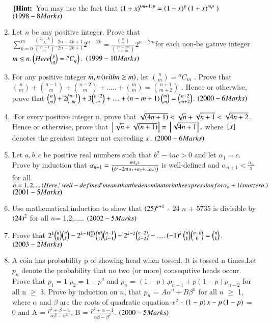 \documentclass[journal,12pt,twocolumn]{IEEEtran}
\theoremstyle{remark}
\begin{document}
\begin{enumerate}[start=16]
		${}\left[\textbf{Hint:}\right.$ You may use the fact that $\left(1+x\right)^{\left(m+1\right)p} = \left(1+x\right)^p\left(1+x\right)^ {mp} \left.\right)$
$\hfill\textcolor{black}{\brak{1998-8 Marks} }$
\item 
Let $n$ be any positive integer. Prove that $\sum\limits^{m}_{k=0}\frac{\binom{2n-k}{k}}{\binom{2n-1}{n}}.\frac{2n-4k+1}{2n-2k+1}2^{n-2k}= \frac{\binom{n}{m}}{\binom{2n-2m}{n-m} } 2^{n-2m}$for each non-be gatuve integer $m\leq n. \left(Here \binom{p}{q} = {}^pC_q\right).$
$\hfill\textcolor{black}{\brak{1999-10 Marks} }$
\item
For any positive integer $m,n\left(with n \geq m\right)$, let $\binom{n}{m} ={}^nC_m$ . Prove that $\binom{n}{m} + \binom{n-1}{m} + \binom{n-2}{m} + ..... + \binom{m}{m} = \binom{n+1}{m+2}$ . Hence or otherwise, prove that $\binom{n}{m} +2\binom{n-1}{m} +3\binom{n-2}{m}+....+ \left(n-m+1\right) \binom{m}{m} = \binom{n+2}{m+2}$.
$\hfill\textcolor{black}{\brak{2000-6 Marks} }$
\item
:For every positive integer n, prove that $\sqrt{\left(4n+1\right)} < \sqrt{n} +\sqrt{n+1} < \sqrt{4n+2}$. Hence or otherwise, prove that ${}\left[\sqrt{n} + \sqrt{\left(n+1\right)}\right]= {}\left[\sqrt{4n+1}\right],$ where ${}\left[x\right]$ denotes the greatest integer not exceeding $x$.
$\hfill\textcolor{black}{\brak{2000-6 Marks} }$
\item
Let $a,b,c$ be positive real numbers such that $b^2 - 4ac > 0$ and let $\alpha_1 = c$. Prove by induction that $\alpha_{n+1} = \frac{a \alpha_{n^2}}{\left(b^2 - 2a \left(\alpha_1 + \alpha_2 + ... \alpha_n\right)\right)}$ is well-defined and $\alpha_{n+1} < \frac{\alpha_n}{2}$ for all $n = 1,2,... \left(Here,'well-defined' means that the denominator in the expression for \alpha_n+1 is not zero.\right)$
$\hfill\textcolor{black}{\brak{2001-5 Marks} }$
\item
Use mathematical induction to show that $\left(25\right)^{n+1}$ - 24 $n$ + 5735 is divisible by $\left(24\right)^2$ for all $n$= 1,2,.....
$\hfill\textcolor{black}{\brak{2002-5 Marks} }$
\item 
Prove that $2^k \binom{n}{0}\binom{n}{k} - 2^{k-1\binom{n}{2}} \binom{n}{1} \binom{n-1}{k-1} + 2^{k-2}\binom{n-2}{k-2} - .....\left(-1\right)^k \binom{n}{k}\binom{n-k}{0} = \binom{n}{k}$.
$\hfill\textcolor{black}{\brak{2003-2 Marks} }$
\item
A coin has probability p of showing head when tossed. It is tossed n times.Let $p_n$ denote the probability that no two (or more) consequtive heads occur. Prove that $p_1=1$ $p_2=1-p^2$ and $p_n$ = $(1-p).p_{n-1} + p(1-p)p_{n-2}$ for all n $\geq$ 3. Prove by induction on $n$, that $p_n$ = $A\alpha^n + B\beta^n$ for all $n$ $\geq$ 1, where $\alpha$ and $\beta$ are the roots of quadratic equation $x^2$ - $\left(1-p\right)x - p\left(1-p\right)$ = 0 and A = $\frac{p^2 + \beta -1}{\alpha\beta-\alpha^2}$, B = $\frac{p^2 + \alpha -1}{\alpha\beta - \beta^2}$.
$\hfill\textcolor{black}{\brak{2000-5 Marks} }$



\end{enumerate}
\end{document}
